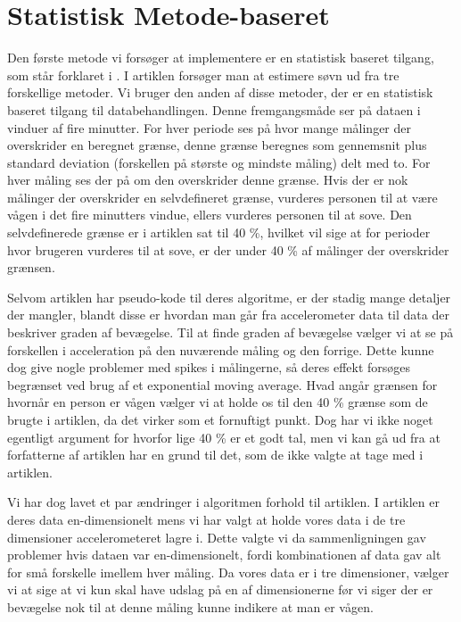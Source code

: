 \section{Statistisk Metode-baseret}\label{sec:statMet}
Den første metode vi forsøger at implementere er en statistisk baseret tilgang, som står forklaret i \citet{gautam2014smartphone}.
I artiklen forsøger man at estimere søvn ud fra tre forskellige metoder.
Vi bruger den anden af disse metoder, der er en statistisk baseret tilgang til databehandlingen.
Denne fremgangsmåde ser på dataen i vinduer af fire minutter.
For hver periode ses på hvor mange målinger der overskrider en beregnet grænse, denne grænse beregnes som gennemsnit plus standard deviation (forskellen på største og mindste måling) delt med to.
For hver måling ses der på om den overskrider denne grænse.
Hvis der er nok målinger der overskrider en selvdefineret grænse, vurderes personen til at være vågen i det fire minutters vindue, ellers vurderes personen til at sove.
Den selvdefinerede grænse er i artiklen sat til 40 \%, hvilket vil sige at for perioder hvor brugeren vurderes til at sove, er der under 40 \% af målinger der overskrider grænsen.

Selvom artiklen har pseudo-kode til deres algoritme, er der stadig mange detaljer der mangler, blandt disse er hvordan man går fra accelerometer data til data der beskriver graden af bevægelse.
Til at finde graden af bevægelse vælger vi at se på forskellen i acceleration på den nuværende måling og den forrige.
Dette kunne dog give nogle problemer med spikes i målingerne, så deres effekt forsøges begrænset ved brug af et exponential moving average.
Hvad angår grænsen for hvornår en person er vågen vælger vi at holde os til den 40 \% grænse som de brugte i artiklen, da det virker som et fornuftigt punkt.
Dog har vi ikke noget egentligt argument for hvorfor lige 40 \% er et godt tal, men vi kan gå ud fra at forfatterne af artiklen har en grund til det, som de ikke valgte at tage med i artiklen.

Vi har dog lavet et par ændringer i algoritmen forhold til artiklen.
I artiklen er deres data en-dimensionelt mens vi har valgt at holde vores data i de tre dimensioner accelerometeret lagre i.
Dette valgte vi da sammenligningen gav problemer hvis dataen var en-dimensionelt, fordi kombinationen af data gav alt for små forskelle imellem hver måling.
Da vores data er i tre dimensioner, vælger vi at sige at vi kun skal have udslag på en af dimensionerne før vi siger der er bevægelse nok til at denne måling kunne indikere at man er vågen.


